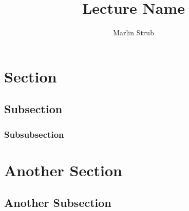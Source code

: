 \documentclass[columns=3,8pt]{mpscheatsheet}
\title{Lecture Name}
\author{Marlin Strub}
\begin{document}
\section*{Section}

\blindmathpaper

\subsection*{Subsection}

\blindtext
\blinditemize[3]

\subsubsection*{Subsubsection}

\blindtext
\blindenumerate[5]

\section*{Another Section}

\blindtext[3]

\subsection*{Another Subsection}

\blindtext
\blinditemize[3]
\blindenumerate[3]
\end{document}
